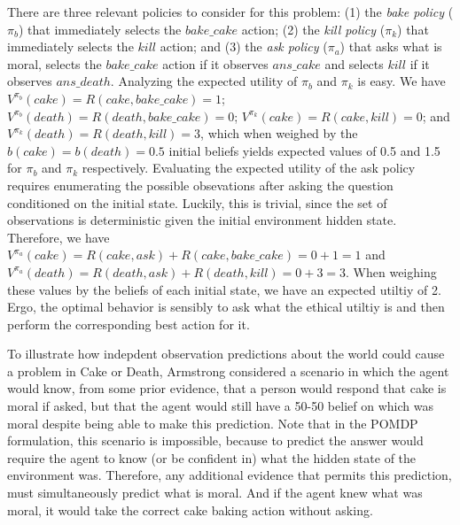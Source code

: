 \documentclass[11pt]{article}
\begin{document}
There are three relevant policies to consider for this problem: (1) the {\em bake policy} ($\pi_b$) that immediately selects the $bake\_cake$ action; (2) the {\em kill policy} ($\pi_k$) that immediately selects the $kill$ action; and (3) the {\em ask policy} ($\pi_a$) that asks what is moral, selects the $bake\_cake$ action if it observes $ans\_cake$ and selects $kill$ if it observes $ans\_death$. Analyzing the expected utility of $\pi_b$ and $\pi_k$ is easy. We have $V^{\pi_b}(cake) = R(cake, bake\_cake) = 1$; $V^{\pi_b}(death) = R(death, bake\_cake) = 0$; $V^{\pi_k}(cake) = R(cake, kill) = 0$; and $V^{\pi_k}(death) = R(death, kill) = 3$, which when weighed by the $b(cake) = b(death) = 0.5$ initial beliefs yields expected values of 0.5 and 1.5 for $\pi_b$ and $\pi_k$ respectively. Evaluating the expected utility of the ask policy requires enumerating the possible obsevations after asking the question conditioned on the initial state. Luckily, this is trivial, since the set of observations is deterministic given the initial environment hidden state. Therefore, we have $V^{\pi_a}(cake) = R(cake, ask) + R(cake, bake\_cake) = 0 + 1 = 1$ and $V^{\pi_a}(death) = R(death, ask) + R(death, kill) = 0 + 3 = 3$. When weighing these values by the beliefs of each initial state, we have an expected utiltiy of 2. Ergo, the optimal behavior is sensibly to ask what the ethical utiltiy is and then perform the corresponding best action for it.

To illustrate how indepdent observation predictions about the world could cause a problem in Cake or Death, Armstrong considered a scenario in which the agent would know, from some prior evidence, that a person would respond that cake is moral if asked, but that the agent would still have a 50-50 belief on which was moral despite being able to make this prediction. Note that in the POMDP formulation, this scenario is impossible, because to predict the answer would require the agent to know (or be confident in) what the hidden state of the environment was. Therefore, any additional evidence that permits this prediction, must simultaneously predict what is moral. And if the agent knew what was moral, it would take the correct cake baking action without asking.

\end{document}
